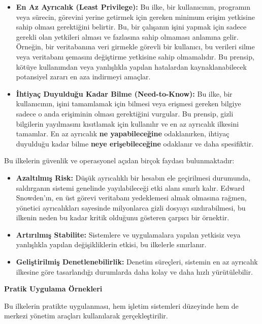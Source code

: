\begin{itemize}
    \item \textbf{En Az Ayrıcalık (Least Privilege):} Bu ilke, bir kullanıcının, programın veya sürecin, görevini yerine getirmek için gereken minimum erişim yetkisine sahip olması gerektiğini belirtir. Bu, bir çalışanın işini yapmak için sadece gerekli olan yetkileri alması ve fazlasına sahip olmaması anlamına gelir. Örneğin, bir veritabanına veri girmekle görevli bir kullanıcı, bu verileri silme veya veritabanı şemasını değiştirme yetkisine sahip olmamalıdır. Bu prensip, kötüye kullanımdan veya yanlışlıkla yapılan hatalardan kaynaklanabilecek potansiyel zararı en aza indirmeyi amaçlar.
    \item \textbf{İhtiyaç Duyulduğu Kadar Bilme (Need-to-Know):} Bu ilke, bir kullanıcının, işini tamamlamak için bilmesi veya erişmesi gereken bilgiye sadece o anda erişiminin olması gerektiğini vurgular. Bu prensip, gizli bilgilerin yayılmasını kısıtlamak için kullanılır ve en az ayrıcalık ilkesini tamamlar. En az ayrıcalık \textbf{ne yapabileceğine} odaklanırken, ihtiyaç duyulduğu kadar bilme \textbf{neye erişebileceğine} odaklanır ve daha spesifiktir.
\end{itemize}

Bu ilkelerin güvenlik ve operasyonel açıdan birçok faydası bulunmaktadır:
\begin{itemize}
    \item \textbf{Azaltılmış Risk:} Düşük ayrıcalıklı bir hesabın ele geçirilmesi durumunda, saldırganın sistemi genelinde yayılabileceği etki alanı sınırlı kalır. Edward Snowden'ın, en üst görevi veritabanı yedeklemesi almak olmasına rağmen, yönetici ayrıcalıkları sayesinde milyonlarca gizli dosyayı sızdırabilmesi, bu ilkenin neden bu kadar kritik olduğunu gösteren çarpıcı bir örnektir.
    \item \textbf{Artırılmış Stabilite:} Sistemlere ve uygulamalara yapılan yetkisiz veya yanlışlıkla yapılan değişikliklerin etkisi, bu ilkelerle sınırlanır.
    \item \textbf{Geliştirilmiş Denetlenebilirlik:} Denetim süreçleri, sistemin en az ayrıcalık ilkesine göre tasarlandığı durumlarda daha kolay ve daha hızlı yürütülebilir.
\end{itemize}

\textbf{Pratik Uygulama Örnekleri}

Bu ilkelerin pratikte uygulanması, hem işletim sistemleri düzeyinde hem de merkezi yönetim araçları kullanılarak gerçekleştirilir.

